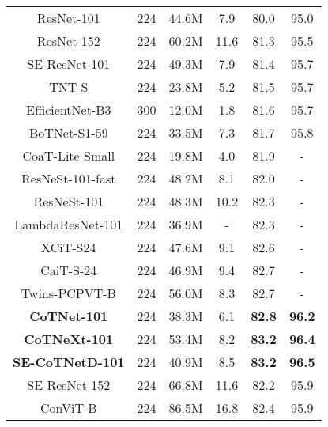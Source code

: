 \documentclass[10pt,twocolumn,letterpaper]{article}
\begin{document}
\begin{table}[!tb]
\begin{tabular}{c|c|cc|cc}
ResNet-101 \cite{he2016deep}                    & 224  & 44.6M  & 7.9    & 80.0       & 95.0       \\
ResNet-152 \cite{he2016deep}                    & 224  & 60.2M  & 11.6   & 81.3       & 95.5       \\
SE-ResNet-101 \cite{hu2018squeeze}              & 224  & 49.3M  & 7.9    & 81.4       & 95.7       \\
TNT-S  \cite{han2021transformer}                & 224  & 23.8M  & 5.2    & 81.5       & 95.7       \\
EfficientNet-B3 \cite{tan2019efficientnet}      & 300  & 12.0M  & 1.8    & 81.6       & 95.7       \\
BoTNet-S1-59 \cite{srinivas2021bottleneck}      & 224  & 33.5M  & 7.3    & 81.7       & 95.8       \\
CoaT-Lite Small \cite{xu2021co}                 & 224  & 19.8M  & 4.0    & 81.9       & -          \\
ResNeSt-101-fast \cite{zhang2020resnest}        & 224  & 48.2M  & 8.1    & 82.0       & -          \\
ResNeSt-101 \cite{zhang2020resnest}             & 224  & 48.3M  & 10.2   & 82.3       & -          \\
LambdaResNet-101\cite{bello2021lambdanetworks}  & 224  & 36.9M  & -      & 82.3       & -          \\
XCiT-S24 \cite{el2021xcit}                      & 224  & 47.6M  & 9.1    & 82.6       & -          \\
CaiT-S-24 \cite{touvron2021going}               & 224  & 46.9M  & 9.4    & 82.7       & -           \\
Twins-PCPVT-B  \cite{chu2021twins}              & 224  & 56.0M  & 8.3    & 82.7       & -         \\   \hline
\textbf{CoTNet-101}                             & 224  & 38.3M  & 6.1    & \textbf{82.8}       & \textbf{96.2}       \\
\textbf{CoTNeXt-101}                            & 224  & 53.4M  & 8.2    & \textbf{83.2}       & \textbf{96.4}       \\
\textbf{SE-CoTNetD-101}                         & 224  & 40.9M  & 8.5    & \textbf{83.2}       & \textbf{96.5}  \\ \hline\hline
SE-ResNet-152 \cite{hu2018squeeze}              & 224  & 66.8M  & 11.6   & 82.2       & 95.9       \\
ConViT-B  \cite{d2021convit}                    & 224  & 86.5M  & 16.8   & 82.4       & 95.9       \\

\end{tabular}
\end{table}
\end{document}
